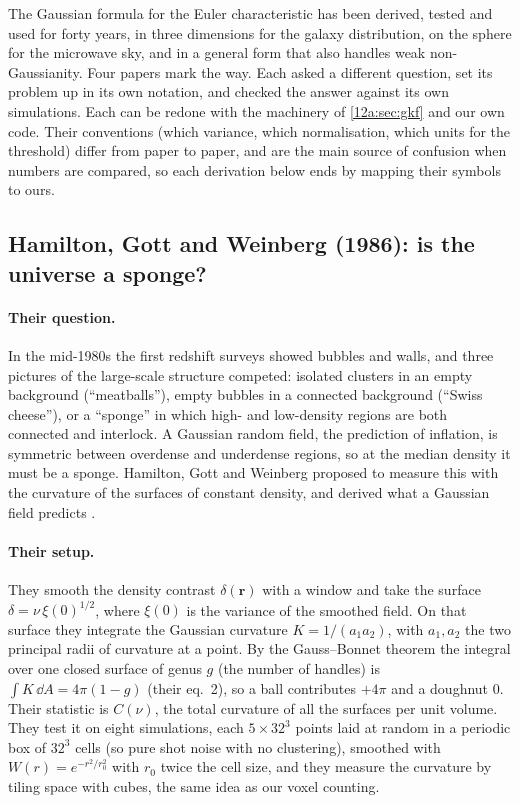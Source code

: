 The Gaussian formula for the Euler characteristic has been derived, tested and used for forty years, in three
dimensions for the galaxy distribution, on the sphere for the microwave sky, and in a general form that also
handles weak non-Gaussianity. Four papers mark the way. Each asked a different question, set its problem up
in its own notation, and checked the answer against its own simulations. Each can be redone with the machinery of \cref{12a:sec:gkf} and our own code. Their conventions (which
variance, which normalisation, which units for the threshold) differ from paper to paper, and are the main
source of confusion when numbers are compared, so each derivation below ends by mapping their symbols to ours.

\subsection{Hamilton, Gott and Weinberg (1986): is the universe a sponge?}
\label{12a:sec:hgw}

\paragraph{Their question.} In the mid-1980s the first redshift surveys showed bubbles and walls, and three
pictures of the large-scale structure competed: isolated clusters in an empty background (``meatballs''),
empty bubbles in a connected background (``Swiss cheese''), or a ``sponge'' in which high- and low-density
regions are both connected and interlock. A Gaussian random field, the prediction of inflation, is
symmetric between overdense and underdense regions, so at the median density it must be a sponge.
Hamilton, Gott and Weinberg proposed to measure this with the curvature of the surfaces of constant
density, and derived what a Gaussian field predicts \cite{HamiltonGottWeinberg1986}.

\paragraph{Their setup.} They smooth the density contrast $\delta(\bm r)$ with a window and take the surface
$\delta=\nu\,\xi(0)^{1/2}$, where $\xi(0)$ is the variance of the smoothed field. On that surface they
integrate the Gaussian curvature $K=1/(a_1a_2)$, with $a_1,a_2$ the two principal radii of curvature at a
point. By the Gauss--Bonnet theorem the integral over one closed surface of genus $g$ (the number of handles)
is $\int K\,\dd A=4\pi(1-g)$ (their eq.~2), so a ball contributes $+4\pi$ and a doughnut $0$. Their statistic is
$C(\nu)$, the total curvature of all the surfaces per unit volume. They test it on eight simulations, each
$5\times32^3$ points laid at random in a periodic box of $32^3$ cells (so pure shot noise with no clustering),
smoothed with $W(r)=e^{-r^2/r_0^2}$ with $r_0$ twice the cell size, and they measure the curvature by tiling
space with cubes, the same idea as our voxel counting.

